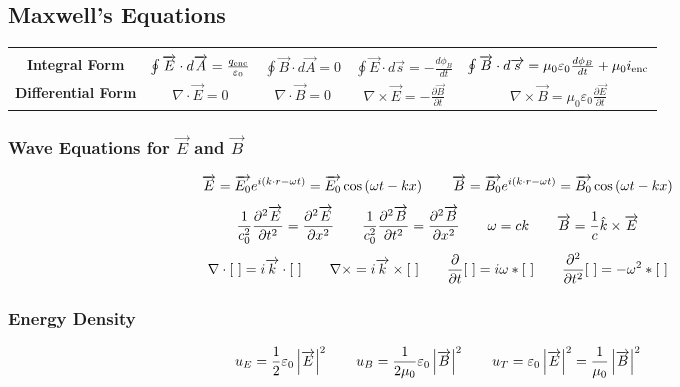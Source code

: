 \documentclass{article}
\begin{document}
\subsection*{Maxwell's Equations}
\begin{center}
\begin{tabular}{|| c c c c c ||}
\hline
&&&&\\
\textbf{Integral Form} & \(\oint\overrightarrow{E}\cdot d\overrightarrow{A}=\frac{q_{\textnormal{enc}}}{\varepsilon_0}\) & \(\oint\overrightarrow{B}\cdot d\overrightarrow{A}=0\) & \(\oint\overrightarrow{E}\cdot d\overrightarrow{s}=-\frac{d\phi_B}{dt}\) & \(\oint\overrightarrow{B}\cdot d\overrightarrow{s}=\mu_0\varepsilon_0\frac{d\phi_B}{dt}+\mu_0i_{\textnormal{enc}}\) \\[10pt]
\textbf{Differential Form} & \(\nabla\cdot\overrightarrow{E}=0\) & \(\nabla\cdot\overrightarrow{B}=0\) & \(\nabla\times\overrightarrow{E}=-\frac{\partial\overrightarrow{B}}{\partial t}\) & \(\nabla\times\overrightarrow{B}=\mu_0\varepsilon_0\frac{\partial\overrightarrow{E}}{\partial t}\)\\[10pt]
\hline
\end{tabular}
\end{center}
\subsubsection*{Wave Equations for \(\overrightarrow{E}\) and \(\overrightarrow{B}\)}
\[\overrightarrow{E}=\overrightarrow{E_0}e^{i(k\cdot r-\omega t)}=\overrightarrow{E_0}\cos\left(\omega t -kx\right)\hspace{7 mm}\overrightarrow{B}=\overrightarrow{B_0}e^{i(k\cdot r-\omega t)}=\overrightarrow{B_0}\cos\left(\omega t -kx\right)\]
\[\frac{1}{c_0^2}\frac{\partial^2\overrightarrow{E}}{\partial t^2}=\frac{\partial^2\overrightarrow{E}}{\partial x^2}\hspace{7 mm}\frac{1}{c_0^2}\frac{\partial^2\overrightarrow{B}}{\partial t^2}=\frac{\partial^2\overrightarrow{B}}{\partial x^2}\hspace{7 mm}\omega=ck\hspace{7 mm}\overrightarrow{B}=\frac{1}{c}\hat{k}\times\overrightarrow{E}\]
\[\nabla\cdot[\,\,]=i\overrightarrow{k}\cdot[\,\,]\hspace{7 mm}\nabla\times=i\overrightarrow{k}\times[\,\,]\hspace{7 mm}\frac{\partial}{\partial t}[\,\,]=i\omega*[\,\,]\hspace{7 mm}\frac{\partial^2}{\partial t^2}[\,\,]=-\omega^2*[\,\,]\]
\subsubsection*{Energy Density}
\[u_E=\frac{1}{2}\varepsilon_0\left|\overrightarrow{E}\right|^2\hspace{7 mm}u_B=\frac{1}{2\mu_0}\varepsilon_0\left|\overrightarrow{B}\right|^2\hspace{7 mm}u_T=\varepsilon_0\left|\overrightarrow{E}\right|^2=\frac{1}{\mu_0}\left|\overrightarrow{B}\right|^2\]
\end{document}
